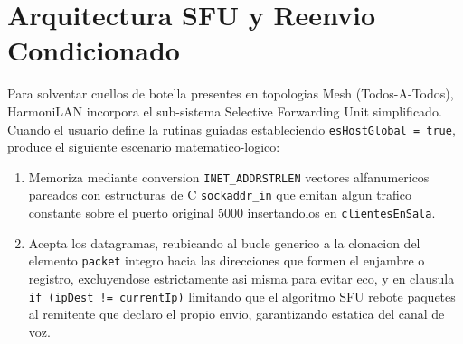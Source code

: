 \documentclass{article}
\begin{document}
\section{Arquitectura SFU y Reenvio Condicionado}
Para solventar cuellos de botella presentes en topologias Mesh (Todos-A-Todos), HarmoniLAN incorpora el sub-sistema Selective Forwarding Unit simplificado.
Cuando el usuario define la rutinas guiadas estableciendo \texttt{esHostGlobal = true}, produce el siguiente escenario matematico-logico:

\begin{enumerate}
    \item Memoriza mediante conversion \texttt{INET\_ADDRSTRLEN} vectores alfanumericos pareados con estructuras de C \texttt{sockaddr\_in} que emitan algun trafico constante sobre el puerto original 5000 insertandolos en \texttt{clientesEnSala}.
    \item Acepta los datagramas, reubicando al bucle generico a la clonacion del elemento \texttt{packet} integro hacia las direcciones que formen el enjambre o registro, excluyendose estrictamente asi misma para evitar eco, y en clausula \texttt{if (ipDest != currentIp)} limitando que el algoritmo SFU rebote paquetes al remitente que declaro el propio envio, garantizando estatica del canal de voz.
\end{enumerate}
\end{document}
